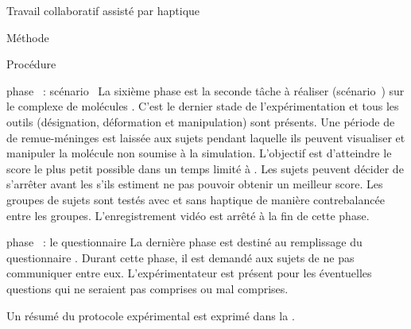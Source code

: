 \documentclass[myfrancais]{mythesis}
\begin{document}
\begin{mychapter}{Travail collaboratif assisté par haptique}
\begin{mysection}{Méthode}
\begin{mysubsection}{Procédure}
				\begin{myparagraph}{phase~ : scénario~}
					La sixième phase est la seconde tâche à réaliser (scénario~) sur le complexe de molécules \myNusENusG.
					C'est le dernier stade de l'expérimentation et tous les outils (désignation, déformation et manipulation) sont présents.
					Une période de  de remue-méninges est laissée aux sujets pendant laquelle ils peuvent visualiser et manipuler la molécule non soumise à la simulation.
					L'objectif est d'atteindre le score  le plus petit possible dans un temps limité à .
					Les sujets peuvent décider de s'arrêter avant les  s'ils estiment ne pas pouvoir obtenir un meilleur score.
					Les groupes de sujets sont testés avec et sans haptique de manière contrebalancée entre les groupes.
					L'enregistrement vidéo est arrêté à la fin de cette phase.
				\end{myparagraph}
				\begin{myparagraph}{phase~ : le questionnaire}
					La dernière phase est destiné au remplissage du questionnaire .
					Durant cette phase, il est demandé aux sujets de ne pas communiquer entre eux.
					L'expérimentateur est présent pour les éventuelles questions qui ne seraient pas comprises ou mal comprises.
				\end{myparagraph}

				Un résumé du protocole expérimental est exprimé dans la .


\end{mysubsection}
\end{mysection}
\end{mychapter}
\end{document}
